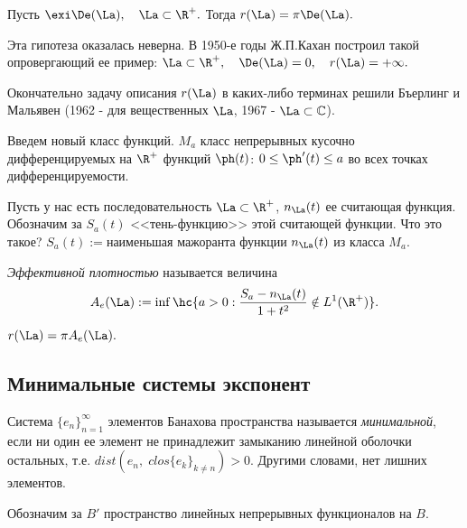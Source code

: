 \documentclass[a4paper]{article}
\begin{document}
\begin{hypotetic}[Шварца]
  Пусть $\exi\De(\La),\quad\La\subset\R ^{+}.$ Тогда
  $r(\La)=\pi\De(\La).$
\end{hypotetic}

Эта гипотеза оказалась неверна. В 1950-е годы Ж.П.Кахан построил
такой опровергающий ее пример:
$\La\subset\R ^{+},\quad\De(\La)=0,\quad
r(\La)=+\infty.$

Окончательно задачу описания $r(\La)$ в каких-либо терминах
решили Бъерлинг и Мальявен (1962 - для вещественных $\La$,
1967 - $\La\subset\mathbb{C}$).

Введем новый класс функций. $M_a$ класс непрерывных кусочно
дифференцируемых на $\R ^{+}$ функций $\ph(t)$:
$0\le\ph'(t)\le a$ во всех точках дифференцируемости.

\begin{wrapfigure}[7]{l}{5.4cm}
\end{wrapfigure}

Пусть у нас есть последовательность
$\La\subset\R ^{+}$, $n_{\La}(t)$ ее считающая
функция. Обозначим за $S_a(t)$ <<тень-функцию>> этой считающей
функции. Что это такое? $S_a(t):=$наименьшая мажоранта функции
$n_{\La}(t)$ из класса $M_a$.

\begin{df}
  \emph{Эффективной плотностью} называется
  величина
  \begin{equation*}
    A_e(\La):=\inf\hc{a>0:\frac{S_a-n_{\La}(t)}{1+t^2}\notin
    L^1(\R ^{+})}.
  \end{equation*}
\end{df}

\begin{theorem}
$r(\La)=\pi A_e(\La).$
\end{theorem}

\subsection{Минимальные системы экспонент}

\begin{df}
  Система $\{e_n\}_{n=1}^{\infty}$ элементов Банахова пространства
  называется \emph{минимальной}, если ни один ее элемент не
  принадлежит замыканию линейной оболочки остальных, т.е.
  $dist(e_n,\;clos \{e_k\}_{k\neq n})>0$. Другими словами, нет лишних
  элементов.
\end{df}

\begin{denote}
  Обозначим за $B'$ пространство линейных непрерывных функционалов
  на $B.$
\end{denote}
\end{document}
